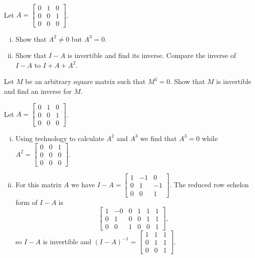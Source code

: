 \begin{example} ~
\ba
\item Let $A = \left[ \begin{array}{ccc} 0&1&0\\0&0&1\\0&0&0 \end{array} \right]$. 
	\begin{enumerate}[i.]
	\item Show that $A^2 \neq 0$ but $A^3 = 0$. 
	
	\item Show that $I - A$ is invertible and find its inverse. Compare the inverse of $I-A$ to $I+A+A^2$. 
	
	\end{enumerate}

\item Let $M$ be an arbitrary square matrix such that $M^3 = 0$. Show that $M$ is invertible and find an inverse for $M$.

\ea


\ExampleSolution
\ba
\item Let $A = \left[ \begin{array}{ccc} 0&1&0\\0&0&1\\0&0&0 \end{array} \right]$. 
	\begin{enumerate}[i.]
	\item Using technology to calculate $A^2$ and $A^3$ we find that $A^3=0$ while $A^2 =  \left[ \begin{array}{ccc} 0&0&1\\0&0&0\\0&0&0 \end{array} \right]$.
	
	\item For this matrix $A$ we have $I - A = \left[ \begin{array}{crr} 1&-1&0\\0&1&-1\\0&0&1 \end{array} \right]$. The reduced row echelon form of $I-A$ is 
	\[\left[ \begin{array}{ccc|ccc} 1&-0&0&1&1&1\\0&1&0&0&1&1\\0&0&1&0&0&1 \end{array} \right],\]
	so $I-A$ is invertible and $(I-A)^{-1} = \left[ \begin{array}{ccc} 1&1&1\\0&1&1\\0&0&1 \end{array} \right]$. 
	

\end{enumerate}
\end{example}
